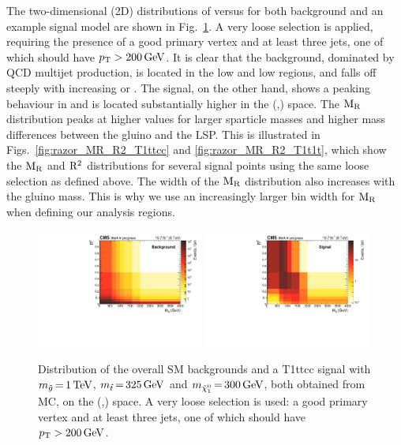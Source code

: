 The two-dimensional (2D) distributions of \rsq versus \mr for both background and an example signal
model are shown in Fig.~\ref{fig:razor_MR_Rsq_bg_signal}. A very loose selection is applied,
requiring the presence of a good primary vertex and at least three jets, one of which should have
$p_{\mathrm{T}} > 200\,\text{Ge\hspace{-.08em}V}$. It is clear that the background, dominated by QCD multijet production, is located
in the low \mr and low \rsq regions, and falls off steeply with increasing \mr or \rsq.
The signal, on the other hand, shows a peaking behaviour in \mr and is located substantially higher
in the (\mr,\rsq) space. 
The $\mathrm{M_R}$ distribution peaks at higher values for larger sparticle masses and higher mass
differences between the gluino and the LSP. This is illustrated
in Figs.~\ref{fig:razor_MR_R2_T1ttcc} and \ref{fig:razor_MR_R2_T1t1t}, which show the $\mathrm{M_R}$ and
$\mathrm{R^2}$ distributions for several signal points using the same loose selection as defined above.
The width of the $\mathrm{M_R}$ distribution also increases with the gluino mass. This is why we use an
increasingly larger bin width for $\mathrm{M_R}$ when defining our analysis regions. 


\begin{figure}[htpb]
\centering
\includegraphics[width=0.49\textwidth]{figures/razor_variables/MR_R2_jet1ptg200_bg_BPS} 
\includegraphics[width=0.49\textwidth]{figures/razor_variables/MR_R2_jet1ptg200_sig_BPS}
\caption{Distribution of the overall SM backgrounds and a T1ttcc signal with $m_{\tilde{g}} \,{=}\,
1\,\text{Te\hspace{-.08em}V}$, $m_{\tilde{t}} \,{=}\, 325\,\text{Ge\hspace{-.08em}V}$ and $m_{\tilde{\chi}_1^0} \,{=}\, 300\,\text{Ge\hspace{-.08em}V}$, both obtained
from MC, on the (\mr,\rsq) space. A very loose selection is used:  a good primary vertex and at
least three jets, one of which should have $p_{\mathrm{T}} > 200\,\text{Ge\hspace{-.08em}V}$. 
\label{fig:razor_MR_Rsq_bg_signal}}
\end{figure}

